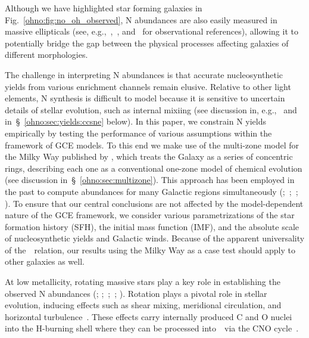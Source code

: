 Although we have highlighted star forming galaxies in
Fig.~\ref{ohno:fig:no_oh_observed}, N abundances are also easily measured in
massive ellipticals (see, e.g.,~\citealp{Schiavon2010},~\citealp{Conroy2013b},
and~\citealp*{Conroy2014} for observational references), allowing it to
potentially bridge the gap between the physical processes affecting galaxies of
different morphologies.
\par
The challenge in interpreting N abundances is that accurate nucleosynthetic
yields from various enrichment channels remain elusive.
Relative to other light elements, N synthesis is difficult to model because it
is sensitive to uncertain details of stellar evolution, such as internal
mixiing (see discussion in, e.g.,~\citealp{Andrews2017} and
in~\S~\ref{ohno:sec:yields:ccsne} below).
In this paper, we constrain N yields empirically by testing the performance of
various assumptions within the framework of GCE models.
To this end we make use of the multi-zone model for the Milky Way published by
\citet{Johnson2021}, which treats the Galaxy as a series of concentric rings,
describing each one as a conventional one-zone model of chemical evolution
(see discussion in~\S~\ref{ohno:sec:multizone}).
This approach has been employed in the past to compute abundances for many
Galactic regions simultaneously (\citealp{Matteucci1989, Wyse1989, Prantzos1995,
Schoenrich2009a};~\citealp*{Minchev2013, Minchev2014};~\citealp{Minchev2017};
\citealp*{Sharma2021}).
To ensure that our central conclusions are not affected by the model-dependent
nature of the GCE framework, we consider various parametrizations of the star
formation history (SFH), the initial mass function (IMF), and the absolute
scale of nucleosynthetic yields and Galactic winds.
Because of the apparent universality of the~\ohno~relation, our results using
the Milky Way as a case test should apply to other galaxies as well.
\par
At low metallicity, rotating massive stars play a key role in establishing the
observed N abundances (\citealp*{Chiappini2003, Chiappini2005};
\citealp{Chiappini2006};~\citealp*{Kobayashi2011};~\citealp{Prantzos2018};
\citealp*{Grisoni2021}).
Rotation plays a pivotal role in stellar evolution, inducing effects such as
shear mixing, meridional circulation, and horizontal turbulence~\citep{Zahn1992, 
Maeder1998, Lagarde2012}.
These effects carry internally produced C and O nuclei into the H-burning shell
where they can be processed into~\Nfourteen~via the CNO cycle~\citep{Heger2010,
Frischknecht2016, Andrews2017}.
